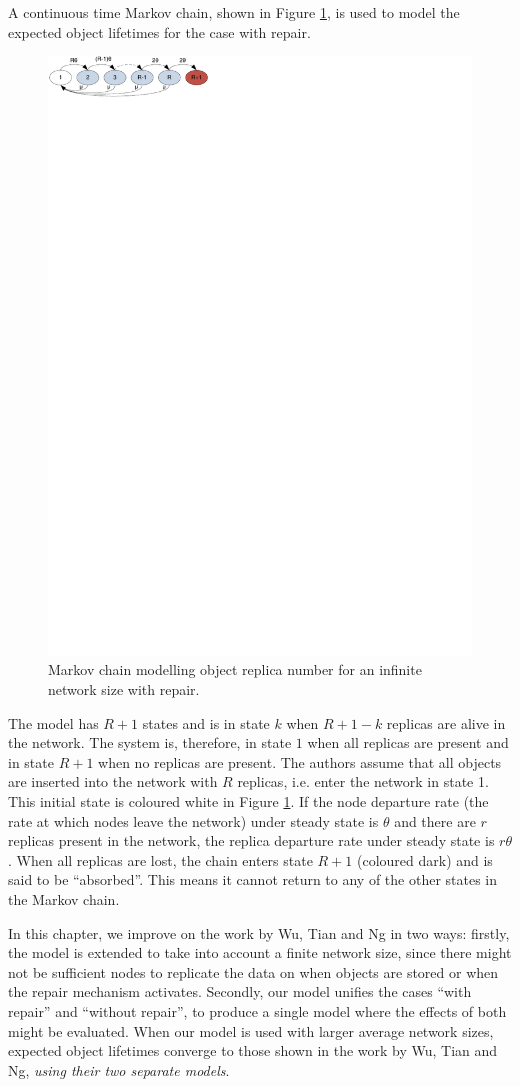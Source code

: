 \documentclass[10pt,a4paper,conference]{IEEEtran}
\begin{document}
A continuous time Markov chain, shown in Figure \ref{fig_other_markov_chain}, is used to model the expected object lifetimes for the case with repair.
%
\begin{figure}[htbp]
 \centering
 \includegraphics[clip=true, viewport=0.0cm 27.5cm 8.0cm 30.0cm, width=0.7\columnwidth]{inifinite_network_chain}
 \caption{Markov chain modelling object replica number for an infinite network size with repair.}
 \label{fig_other_markov_chain}
\end{figure}
%
The model has $R+1$ states and is in state $k$ when $R+1-k$ replicas are alive in the network. The system is, therefore, in state $1$ when all replicas are present and in state $R+1$ when no replicas are present. The authors assume that all objects are inserted into the network with $R$ replicas, i.e. enter the network in state 1. This initial state is coloured white in Figure \ref{fig_other_markov_chain}. If the node departure rate (the rate at which nodes leave the network) under steady state is $\theta$ and there are $r$ replicas present in the network, the replica departure rate under steady state is $r\theta$. When all replicas are lost, the chain enters state $R+1$ (coloured dark) and is said to be ``absorbed''. This means it cannot return to any of the other states in the Markov chain.

In this chapter, we improve on the work by Wu, Tian and Ng \cite{replication_article} in two ways: firstly, the model is extended to take into account a finite network size, since there might not be sufficient nodes to replicate the data on when objects are stored or when the repair mechanism activates. Secondly, our model unifies the cases ``with repair'' and ``without repair'', to produce a single model where the effects of both might be evaluated. When our model is used with larger average network sizes, expected object lifetimes converge to those shown in the work by Wu, Tian and Ng, \emph{using their two separate models}.
\end{document}

